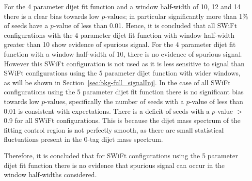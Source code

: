 For the 4 parameter dijet fit function and a window half-width of 10, 12 and 14
there is a clear bias towards low \bh{} \mbox{$p$-value}s;
in particular significantly more than 1\% of seeds have a \bh{} \mbox{$p$-value} of less than 0.01.
Hence, it is concluded that all SWiFt configurations with the 4 parameter dijet fit function with window half-width greater than 10
show evidence of spurious signal.
For the 4 parameter dijet fit function with a window half-width of 10, there is no evidence of spurious signal.
However this SWiFt configuration is not used as it is less sensitive to signal than SWiFt configurations
using the 5 parameter dijet function with wider windows, as will be shown in Section~\ref{sec:bkg-full_signalInj}.
In the case of all SWiFt configurations using the 5 parameter dijet fit function
there is no significant bias towards low \bh{} \mbox{$p$-value}s,
specifically the number of seeds with a \bh{} \mbox{$p$-value} of less than 0.01 is consistent with expectations.
There is a deficit of seeds with a \bh{} $p$-value $>$ 0.9 for all SWiFt configurations.
This is because the dijet mass spectrum of the fitting control region is not perfectly smooth,
as there are small statistical fluctuations present in the 0-tag dijet mass spectrum.

Therefore, it is concluded that for SWiFt configurations using the 5 parameter dijet fit function
there is no evidence that spurious signal can occur in the window half-widths considered.

